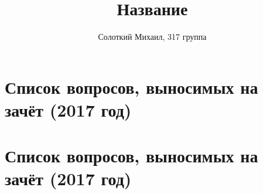 \documentclass[10pt]{extarticle}
\title{Название}
\author{Солоткий Михаил, 317 группа}
\begin{document}
\maketitle
	\section*{Список вопросов, выносимых на зачёт (2017 год)}
	\section{Список вопросов, выносимых на зачёт (2017 год)}
\end{document}
